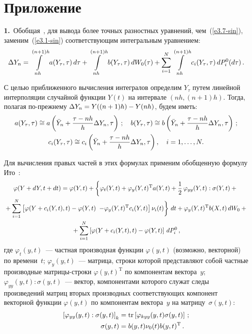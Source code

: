 \setcounter{equation}{0}
{\small \section*{\raggedleft Приложение}

\renewcommand{\theequation}{П.\arabic{equation}}

\textbf{1.}\ Обобщая~\cite{2-sin, 3-sin}, для вывода более точных
разностных уравнений, чем~(\ref{e3.7-sin}), заменим~(\ref{e3.1-sin})
соответствующим интегральным уравнением:
    \begin{equation}
    \Delta Y_n=\int\limits_{nh}^{(n+1)h} a(Y_{\tau},\tau)\,d\tau +\int\limits_{nh}^{(n+1)h}
    b(Y_{\tau},\tau)\,dW_0(\tau)+\sum_{i=1}^N \int\limits_{nh}^{(n+1)h} c_i(Y_{\tau},\tau)\,dP_i^0(d\tau)\,.\label{ep1}
    \end{equation}

С целью приближенного вычисления интегралов определим $Y_{\tau}$ путем
линейной интерполяции случайной функции $Y(t)$ на интервале $(nh,
(n+1)h)$. Тогда, полагая по-преж\-не\-му $\Delta Y_n\hm=Y((n+1)h)\hm-Y(nh)$,
будем иметь:
    \begin{gather*}
    a(Y_{\tau},\tau)\cong a\left(\bar Y_n+{\displaystyle\frac{\displaystyle \tau-nh\mathstrut}{\displaystyle h\mathstrut}} \Delta
    Y_n,\tau\right)\,;\quad
    b(Y_{\tau},\tau)\cong b\left(\bar Y_n+{\displaystyle\frac{\displaystyle \tau-nh\mathstrut}{\displaystyle h\mathstrut}} \Delta
    Y_n,\tau\right)\,;\\ 
c_i(Y_{\tau},\tau)\cong  c_i\left(\bar Y_n+{\displaystyle\frac{\displaystyle \tau-nh\mathstrut}{\displaystyle h\mathstrut}} \Delta Y_n,\tau\right),
    \quad i=1,\ldots,N.
    \end{gather*}

Для вычисления правых частей в этих формулах применим обобщенную
формулу Ито~\cite{2-sin, 3-sin}:
\begin{multline}
\varphi(Y+dY, t+dt)=\varphi(Y,t)
    +\left\{\varphi_t(Y,t)+\varphi_y(Y,t)^{\mathrm{T}}a(Y,t)+\fr{1}{2}\,\varphi_{yy}(Y,t):\sigma(Y,t)+{}\right.\\
    {}+
    \sumin \left[ \vphantom{(Y)^{\mathrm{T}}}
    \varphi(Y+c_i(Y,t),t)-\varphi(Y,t)\right.
    \left.\left. -\varphi_y(Y,t)^{\mathrm{T}} c_i(Y,t)\right]\nu_i(t)
    \vphantom{\fr{1}{2}}\right\}\,dt +
    \varphi_y(Y,t)^{\mathrm{T}}b(X,t)\,dW_0+{}\\
    {}+\sumin \left[\varphi(Y+c_i(Y,t),t)-\varphi(Y,t)\right]\, dP_i^0\,,\label{ep3}
    \end{multline}
где $\varphi_t(y,t)$~--- частная производная функции $\varphi(y,t)$
(возможно, векторной) по времени~$t$; $\varphi_y(y,t)$~--- матрица,
строки которой представляют собой частные производные мат\-ри\-цы-стро\-ки
$\varphi(y,t)^{\mathrm{T}}$ по компонентам вектора~$y$;
$\varphi_{yy}(y,t):\sigma(y,t)$~--- вектор, компонентами которого
служат следы произведений матриц вторых производных соответствующих
компонент векторной функции $\varphi(y,t)$ по компонентам вектора~$y$
на мат\-ри\-цу~$\sigma(y,t)$:
    \begin{align}
    \left [\varphi_{yy}(y,t):\sigma(y,t)\right]_k&=\mbox{tr}
    \left[\varphi_{kyy}(y,t)\sigma(y,t)\right]\,;\notag %
\\
    \sigma(y,t)&=b(y,t)\nu_0(t)b(y,t)^{\mathrm{T}}\,.\label{ep5}
    \end{align}

}
